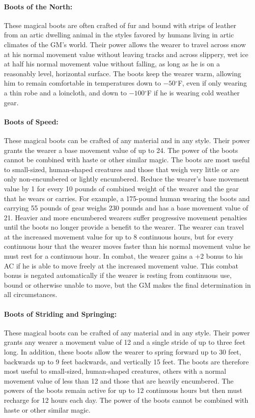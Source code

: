 \begin{multicols}{2}
\paragraph{Boots of the North:} These magical boots are often crafted of fur and bound with strips of leather from an artic dwelling animal in the styles favored by humans living in artic climates of the GM's world.  Their power allows the wearer to travel across snow at his normal movement value without leaving tracks and across slippery, wet ice at half his normal movement value without falling, as long as he is on a reasonably level, horizontal surface.  The boots keep the wearer warm, allowing him to remain comfortable in temperatures down to $-50$$^\circ$F, even if only wearing a thin robe and a loincloth, and down to $-100$$^\circ$F if he is wearing cold weather gear.  

\paragraph{Boots of Speed:} These magical boots can be crafted of any material and in any style.  Their power grants the wearer a base movement value of up to 24.  The power of the boots cannot be combined with haste or other similar magic.  The boots are most useful to small-sized, human-shaped creatures and those that weigh very little or are only non-encumbered or lightly encumbered.  Reduce the wearer's base movement value by 1 for every 10 pounds of combined weight of the wearer and the gear that he wears or carries.  For example, a 175-pound human wearing the boots and carrying 55 pounds of gear weighs 230 pounds and has a base movement value of 21.  Heavier and more encumbered wearers suffer progressive movement penalties until the boots no longer provide a benefit to the wearer.  The wearer can travel at the increased movement value for up to 8 continuous hours, but for every continuous hour that the wearer moves faster than his normal movement value he must rest for a continuous hour.  In combat, the wearer gains a +2 bonus to his AC if he is able to move freely at the increased movement value.  This combat bonus is negated automatically if the wearer is resting from continuous use, bound or otherwise unable to move, but the GM makes the final determination in all circumstances.

\paragraph{Boots of Striding and Springing:}  These magical boots can be crafted of any material and in any style.  Their power grants any wearer a movement value of 12 and a single stride of up to three feet long.  In addition, these boots allow the wearer to spring forward up to 30 feet, backwards up to 9 feet backwards, and vertically 15 feet.  The boots are therefore most useful to small-sized, human-shaped creatures, others with a normal movement value of less than 12 and those that are heavily encumbered.  The powers of the boots remain active for up to 12 continuous hours but then must recharge for 12 hours each day.  The power of the boots cannot be combined with haste or other similar magic.


\end{multicols}
